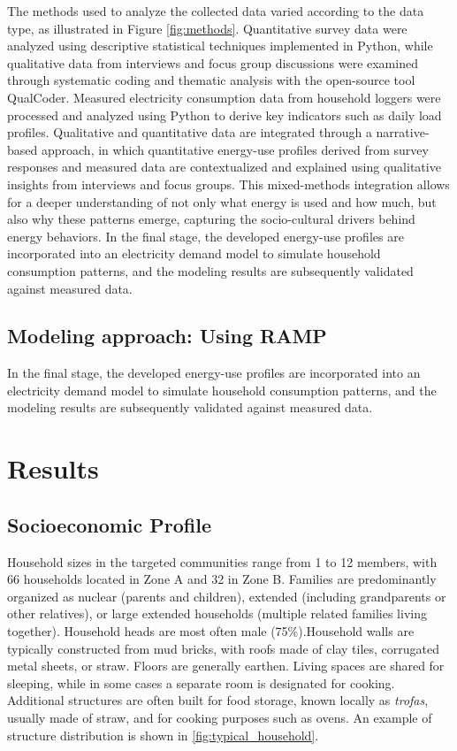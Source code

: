 \documentclass[final,3p,times,onecolumn]{elsarticle}
\begin{document}
    The methods used to analyze the collected data varied according to the data type, as illustrated in Figure \ref{fig:methods}. Quantitative survey data were analyzed using descriptive statistical techniques implemented in Python, while qualitative data from interviews and focus group discussions were examined through systematic coding and thematic analysis with the open-source tool QualCoder. Measured electricity consumption data from household loggers were processed and analyzed using Python to derive key indicators such as daily load profiles. 
    Qualitative and quantitative data are integrated through a narrative-based approach, in which quantitative energy-use profiles derived from survey responses and measured data are contextualized and explained using qualitative insights from interviews and focus groups. This mixed-methods integration allows for a deeper understanding of not only what energy is used and how much, but also why these patterns emerge, capturing the socio-cultural drivers behind energy behaviors.
    In the final stage, the developed energy-use profiles are incorporated into an electricity demand model to simulate household consumption patterns, and the modeling results are subsequently validated against measured data.

\subsection{Modeling approach: Using RAMP}
\label{sec:modeling}
    In the final stage, the developed energy-use profiles are incorporated into an electricity demand model to simulate household consumption patterns, and the modeling results are subsequently validated against measured data. 
    
\section{Results}
\label{sec:results}

\subsection{Socioeconomic Profile}
\label{sec:raqaypampa}

Household sizes in the targeted communities range from 1 to 12 members, with 66 households located in Zone A and 32 in Zone B. Families are predominantly organized as nuclear (parents and children), extended (including grandparents or other relatives), or large extended households (multiple related families living together). Household heads are most often male (75\%).Household walls are typically constructed from mud bricks, with roofs made of clay tiles, corrugated metal sheets, or straw. Floors are generally earthen. Living spaces are shared for sleeping, while in some cases a separate room is designated for cooking. Additional structures are often built for food storage, known locally as \textit{trofas}, usually made of straw, and for cooking purposes such as ovens. An example of structure distribution is shown in \ref{fig:typical_household}.
\end{document}
